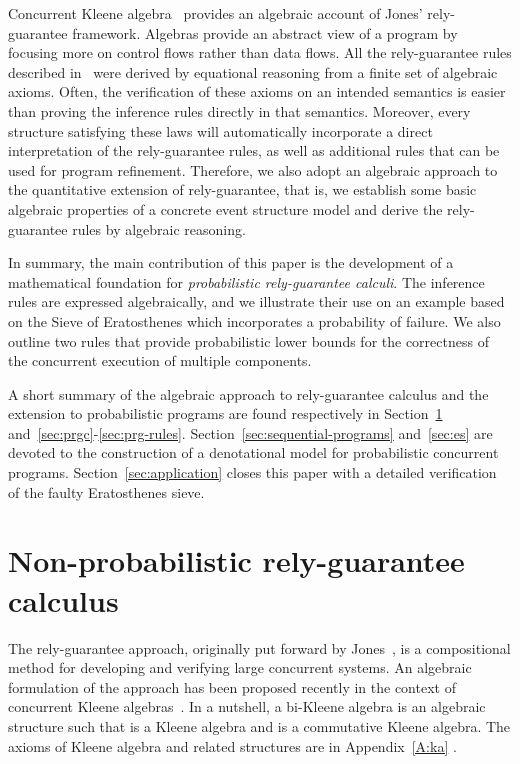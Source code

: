 \documentclass[review]{elsart}
\begin{document}
Concurrent Kleene algebra~\cite{Hoa11,Arm14} provides an algebraic account of Jones' rely-guarantee framework. Algebras provide an abstract view of a program by focusing more on control flows rather than data flows. All the rely-guarantee rules described in~\cite{Hoa11,Arm14} were derived by equational reasoning from a finite set of algebraic axioms. Often, the verification of these axioms on an intended semantics is easier than proving the inference rules directly in that semantics. Moreover, every structure satisfying these laws will automatically incorporate a direct interpretation of the rely-guarantee rules, as well as additional rules that can be used for program refinement. Therefore, we also adopt an algebraic approach to the quantitative extension of rely-guarantee, that is, we establish some basic algebraic properties of a concrete event structure model and derive the rely-guarantee rules by algebraic reasoning.

In summary, the main contribution of this paper is the development of a mathematical foundation for \textit{probabilistic rely-guarantee calculi}. The inference rules are expressed algebraically, and we illustrate their use on an example based on the Sieve of Eratosthenes which incorporates a probability of failure. We also outline two rules that provide probabilistic lower bounds for the correctness of the concurrent execution of multiple components. 

A short summary of the algebraic approach to rely-guarantee calculus and the extension to probabilistic programs are found respectively in Section~\ref{sec:standard-rg} and~\ref{sec:prgc}-\ref{sec:prg-rules}. Section~\ref{sec:sequential-programs} and~\ref{sec:es} are devoted to the construction of a denotational model for probabilistic concurrent programs.
Section~\ref{sec:application} closes this paper with a detailed verification of the faulty Eratosthenes sieve. 





\section{Non-probabilistic rely-guarantee calculus}\label{sec:standard-rg}
The rely-guarantee approach, originally put forward by Jones~\cite{Jon81}, is a compositional method for developing and verifying large concurrent systems. An algebraic formulation of the approach has been proposed recently in the context of concurrent Kleene algebras~\cite{Hoa11}.  In a nutshell, a bi-Kleene algebra is an algebraic structure  such that  is a Kleene algebra and  is a commutative Kleene algebra. The axioms of Kleene algebra and related structures are in Appendix~\ref{A:ka} 
.
\end{document}
